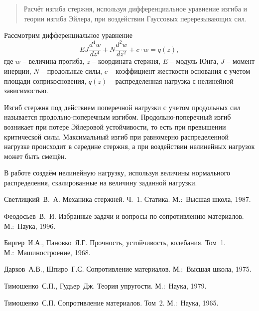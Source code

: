 \maketitle

\begin{abstract}
Расчёт изгиба стержня, используя дифференциальное уравнение изгиба и теории изгиба Эйлера, при воздействии Гауссовых перерезывающих сил.

\end{abstract}


Рассмотрим дифференциальное уравнение
$$
EJ\frac{d^4w}{dz^4}+N\frac{d^2w}{dz^2}+c\cdot w=q(z),
$$
где $w$ -- величина прогиба, $z$ -- координата стержня, $E$ -- модуль Юнга, $J$ -- момент инерции, $N$ -- продольные силы, $c$ -- коэффициент жесткости основания с учетом площади соприкосновения, $q(z)$ -- распределенная нагрузка с нелинейной зависимостью.


 Изгиб стержня под действием поперечной нагрузки с учетом продольных сил называется продольно-поперечным изгибом. Продольно-поперечный изгиб возникает при потере Эйлеровой устойчивости, то есть при превышении критической силы. Максимальный изгиб при равномерно распределенной нагрузке происходит в середине стержня, а при воздействии нелинейных нагрузок может быть смещён.

 В работе создаём нелинейную нагрузку, используя величины нормального распределения, скалированные на величину заданной нагрузки.


%



\begin{thebibliography}{9} %
 Светлицкий~В.~А. Механика стержней. Ч.~1. Статика. М.:~Высшая школа, 1987.

 Феодосьев~В.~И. Избранные задачи и вопросы по сопротивлению материалов.  М.:~Наука, 1996.


 Биргер~И.А., Пановко~Я.Г. Прочность, устойчивость, колебания. Том~1. М.:~Машиностроение, 1968.

 Дарков~А.В., Шпиро~Г.С. Сопротивление материалов. М.:~Высшая школа, 1975.

	Тимошенко~С.П., Гудьер~Дж. Теория упругости. М.:~Наука, 1979.

	Тимошенко~С.П. Сопротивление материалов. Том~2. М.:~Наука, 1965.
\end{thebibliography}




%
